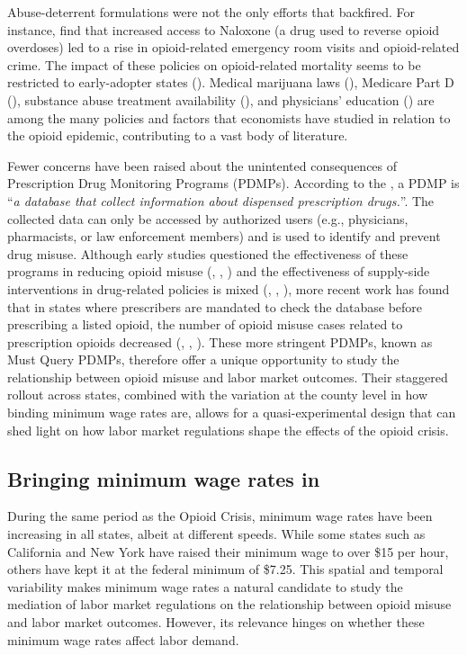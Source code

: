 \documentclass[12pt,a4paper]{article}
\begin{document}
Abuse-deterrent formulations were not the only efforts that backfired. 
For instance, \textcite{Doleac2022} find that increased access to Naloxone (a drug used to reverse opioid overdoses) led to a rise in opioid-related emergency room visits and opioid-related crime. 
The impact of these policies on opioid-related mortality seems to be restricted to early-adopter states (\cite{Rees2019}).
Medical marijuana laws (\cite{Powell2018}), Medicare Part D (\cite{Powell2020}), substance abuse treatment availability (\cite{Swensen2015}), and physicians' education (\cite{Schnell2018}) are among the many policies and factors that economists have studied in relation to the opioid epidemic, contributing to a vast body of literature. 

Fewer concerns have been raised about the unintented consequences of Prescription Drug Monitoring Programs (PDMPs).
According to the \textcite{CDC2021}, a PDMP is ``\textit{a database that collect information about dispensed prescription drugs.}''.
The collected data can only be accessed by authorized users (e.g., physicians, pharmacists, or law enforcement members) and is used to identify and prevent drug misuse.
Although early studies questioned the effectiveness of these programs in reducing opioid misuse (\cite{Paulozzi2011}, \cite{Maughan2015}, \cite{Meara2016}) and the effectiveness of supply-side interventions in drug-related policies is mixed (\cite{Pollack2014}, \cite{Dobkin2019}, \cite{Dobkin2014}), more recent work has found that in states where prescribers are mandated to check the database before prescribing a listed opioid, the number of opioid misuse cases related to prescription opioids decreased (\cite{Buchmueller2018}, \cite{Sacks2021}, \cite{Grecu2019}).
These more stringent PDMPs, known as Must Query PDMPs, therefore offer a unique opportunity to study the relationship between opioid misuse and labor market outcomes.
Their staggered rollout across states, combined with the variation at the county level in how binding minimum wage rates are, allows for a quasi-experimental design that can shed light on how labor market regulations shape the effects of the opioid crisis.

\subsection*{Bringing minimum wage rates in}

During the same period as the Opioid Crisis, minimum wage rates have been increasing in all states, albeit at different speeds.
While some states such as California and New York have raised their minimum wage to over \$15 per hour, others have kept it at the federal minimum of \$7.25.
This spatial and temporal variability makes minimum wage rates a natural candidate to study the mediation of labor market regulations on the relationship between opioid misuse and labor market outcomes. 
However, its relevance hinges on whether these minimum wage rates affect labor demand.
\end{document}
